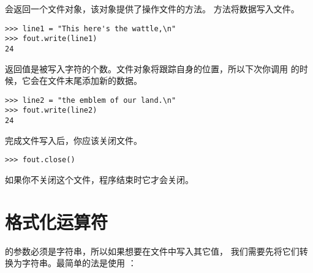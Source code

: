 
 会返回一个文件对象，该对象提供了操作文件的方法。  方法将数据写入文件。

\begin{lstlisting}
>>> line1 = "This here's the wattle,\n"
>>> fout.write(line1)
24
\end{lstlisting}

%

返回值是被写入字符的个数。文件对象将跟踪自身的位置，所以下次你调用 的时候，它会在文件末尾添加新的数据。

\begin{lstlisting}
>>> line2 = "the emblem of our land.\n"
>>> fout.write(line2)
24
\end{lstlisting}

%

完成文件写入后，你应该关闭文件。

\begin{lstlisting}
>>> fout.close()
\end{lstlisting}
%

%

如果你不关闭这个文件，程序结束时它才会关闭。

\section{格式化运算符}
  


 的参数必须是字符串，所以如果想要在文件中写入其它值，
我们需要先将它们转换为字符串。最简单的法是使用  ：

